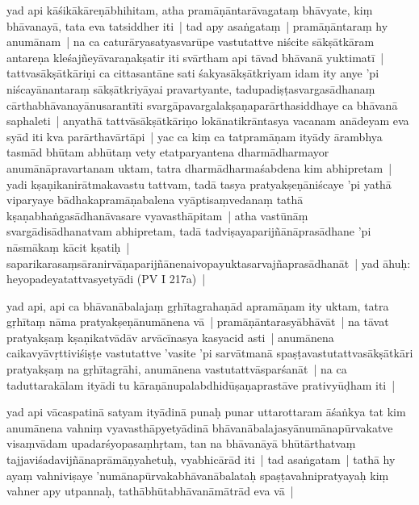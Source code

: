 \documentclass[article,12pt,a4paper]{memoir}%
\newcommand{\persName}[1]{#1}
\newcounter{parCount}
\begin{document}
	  \pstart \leavevmode%
	\label{thakur75-18.18}yad api kāśikākāreṇābhihitam, atha pramāṇāntarāvagataṃ bhāvyate, kiṃ bhāvanayā, tata eva tatsiddher iti | tad apy asaṅgataṃ | pramāṇāntaraṃ hy anumānam | na ca caturāryasatyasvarūpe vastutattve niścite sākṣātkāram antareṇa kleśajñeyāvaraṇakṣatir iti svārtham api tāvad bhāvanā yuktimatī | tattvasākṣātkāriṇi ca cittasantāne sati śakyasākṣātkriyam idam ity anye 'pi niścayānantaraṃ sākṣātkriyāyai pravartyante, tadupadiṣṭasvargasādhanaṃ cārthabhāvanayānusarantīti svargāpavargalakṣaṇaparārthasiddhaye ca bhāvanā saphaleti | anyathā tattvāsākṣātkāriṇo lokānatikrāntasya vacanam anādeyam eva syād iti kva parārthavārtāpi | yac ca kiṃ ca tatpramāṇam ityādy ārambhya tasmād bhūtam abhūtaṃ vety etatparyantena dharmādharmayor anumānāpravartanam uktam, tatra dharmādharmaśabdena kim abhipretam | yadi kṣaṇikanirātmakavastu tattvam, tadā tasya pratyakṣeṇāniścaye 'pi yathā viparyaye bādhakapramāṇabalena vyāptisaṃvedanaṃ tathā kṣaṇabhaṅgasādhanāvasare vyavasthāpitam | atha vastūnāṃ svargādisādhanatvam abhipretam, tadā tadviṣayaparijñānāprasādhane 'pi nāsmākaṃ kācit kṣatiḥ | saparikarasaṃsāranirvāṇaparijñānenaivopayuktasarvajñaprasādhanāt | yad āhuḥ: heyopadeyatattvasyetyādi (PV I 217a) | 
	{}
	\pend%
      

	  \pstart \leavevmode%
	\label{thakur75-18.32}yad api, api ca bhāvanābalajaṃ gṛhītagrahaṇād apramāṇam ity uktam, tatra gṛhītaṃ nāma pratyakṣeṇānumānena vā | pramāṇāntarasyābhāvāt | na tāvat pratyakṣaṃ kṣaṇikatvādāv arvācīnasya kasyacid asti | anumānena caikavyāvṛttiviśiṣṭe vastutattve 'vasite 'pi sarvātmanā spaṣṭavastutattvasākṣātkāri pratyakṣaṃ na gṛhītagrāhi, anumānena vastutattvāsparśanāt | na ca taduttarakālam ityādi tu kāraṇānupalabdhidūṣaṇaprastāve prativyūḍham iti | 
	{}
	\pend%
      

	  \pstart \leavevmode%
	\label{thakur75-19.5}yad api \persName{vācaspatinā} satyam ityādinā punaḥ punar uttarottaram āśaṅkya tat kim anumānena vahniṃ vyavasthāpyetyādinā bhāvanābalajasyānumānapūrvakatve visaṃvādam upadarśyopasaṃhṛtam, tan na bhāvanāyā bhūtārthatvaṃ tajjaviśadavijñānaprāmāṇyahetuḥ, vyabhicārād iti | tad asaṅgatam | tathā hy ayaṃ vahniviṣaye 'numānapūrvakabhāvanābalataḥ spaṣṭavahnipratyayaḥ kiṃ vahner apy utpannaḥ, tathābhūtabhāvanāmātrād eva vā |
	{}
	\pend%
      
\end{document}
